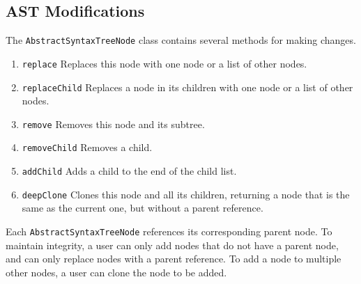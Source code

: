 \subsection{AST Modifications}

The \verb|AbstractSyntaxTreeNode| class contains several methods for making changes.

\begin{enumerate}
\item \verb|replace|  Replaces this node with one node or a list of other nodes.
\item \verb|replaceChild|  Replaces a node in its children with one node or a list of other nodes.
\item \verb|remove| Removes this node and its subtree.
\item \verb|removeChild| Removes a child.
\item \verb|addChild| Adds a child to the end of the child list.
\item \verb|deepClone| Clones this node and all its children, returning a node that is the same as the current one, but without a parent reference.
\end{enumerate}

Each \verb|AbstractSyntaxTreeNode| references its corresponding parent node. 
To maintain integrity, a user can only add nodes that do not have a parent node, and can only replace nodes with a parent reference. 
To add a node to multiple other nodes, a user can clone the node to be added.